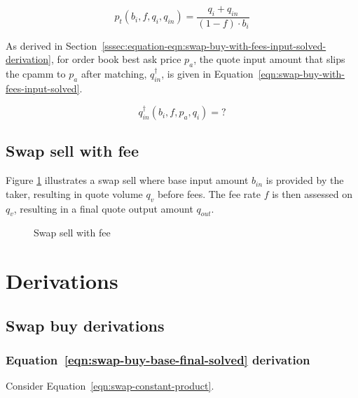 \documentclass[table, twocolumn]{article}
\begin{document}
\begin{equation}\label{eqn:swap-taker-execution-price-buy-solved}
  p_t (b_i, f, q_i, q_{in}) = \frac{q_i + q_{in}}{(1 - f) \cdot b_i}
\end{equation}

As derived in
Section~\ref{sssec:equation-eqn:swap-buy-with-fees-input-solved-derivation}, for order
book best ask price $p_a$, the quote input amount that slips the \gls*{cpamm} to
$p_a$ after matching, $q_{in}^{\dagger}$, is given in
Equation~\ref{eqn:swap-buy-with-fees-input-solved}.

\begin{equation}\label{eqn:swap-buy-with-fees-input-solved}
  q_{in}^{\dagger} (b_i, f, p_a, q_i) = ?
\end{equation}

\subsection{Swap sell with fee}\label{ssec:swap-sell-with-fee}

Figure \ref{fig:swap-sell-with-fee} illustrates a swap sell where base input amount
$b_{in}$ is provided by the taker, resulting in quote volume $q_v$ before fees. The fee
rate $f$ is then assessed on $q_v$, resulting in a final quote output amount $q_{out}$.

\begin{figure}[!htb]
	\centering
	
	\caption{Swap sell with fee}\label{fig:swap-sell-with-fee}
\end{figure}

\section{Derivations}\label{sec:derivations}

\subsection{Swap buy derivations}\label{ssec:swap-buy-derivations}

\subsubsection{Equation~\ref{eqn:swap-buy-base-final-solved} derivation}%
\label{sssec:equation-eqn-swap-buy-base-final-solved-derivation}

Consider Equation~\ref{eqn:swap-constant-product}.
\end{document}
